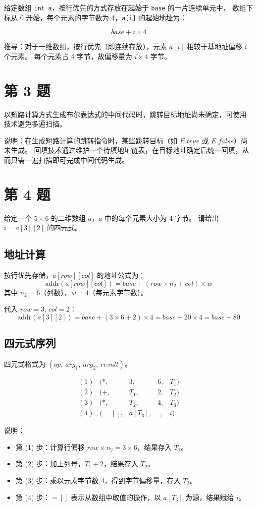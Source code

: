 \documentclass[12pt]{article}
\begin{document}
给定数组 \texttt{int a}，按行优先的方式存放在起始于 \texttt{base} 的一片连续单元中，
数组下标从 0 开始，每个元素的字节数为 4，\texttt{a[i]} 的起始地址为：

\[
\boxed{\,base + i \times 4\,}
\]

推导：对于一维数组，按行优先（即连续存放），元素 $a[i]$ 相较于基地址偏移 $i$ 个元素。
每个元素占 4 字节，故偏移量为 $i \times 4$ 字节。

\section*{第 3 题}

以短路计算方式生成布尔表达式的中间代码时，跳转目标地址尚未确定，可使用
技术避免多遍扫描。

说明：在生成短路计算的跳转指令时，某些跳转目标（如 $E.true$ 或 $E.false$）尚未生成。
回填技术通过维护一个待填地址链表，在目标地址确定后统一回填，从而只需一遍扫描即可完成中间代码生成。

\section*{第 4 题}

给定一个 $5 \times 6$ 的二维数组 $a$，$a$ 中的每个元素大小为 4 字节。
请给出 $i = a[3][2]$ 的四元式。

\subsection*{地址计算}

按行优先存储，$a[row][col]$ 的地址公式为：
\[
\text{addr}(a[row][col]) = base + (row \times n_2 + col) \times w
\]
其中 $n_2 = 6$（列数），$w = 4$（每元素字节数）。

代入 $row=3$, $col=2$：
\[
\text{addr}(a[3][2]) = base + (3 \times 6 + 2) \times 4 = base + 20 \times 4 = base + 80
\]

\subsection*{四元式序列}

四元式格式为 $(op,\ arg_1,\ arg_2,\ result)$。

\[
\begin{array}{lllll}
(1) & (*, & 3, & 6, & T_1) \\
(2) & (+, & T_1, & 2, & T_2) \\
(3) & (*, & T_2, & 4, & T_3) \\
(4) & (=[] , & a[T_3], & \_, & i)
\end{array}
\]

说明：
\begin{itemize}
    \item 第 (1) 步：计算行偏移 $row \times n_2 = 3 \times 6$，结果存入 $T_1$。
    \item 第 (2) 步：加上列号，$T_1 + 2$，结果存入 $T_2$。
    \item 第 (3) 步：乘以元素字节数 4，得到字节偏移量，存入 $T_3$。
    \item 第 (4) 步：$=[]$ 表示从数组中取值的操作，以 $a[T_3]$ 为源，结果赋给 $i$。
\end{itemize}
\end{document}
